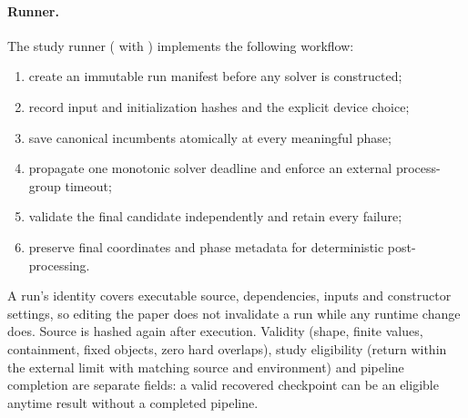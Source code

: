 \paragraph{Runner.} The study runner ( with
) implements the following workflow:
\begin{enumerate}
  \item create an immutable run manifest before any solver is constructed;
  \item record input and initialization hashes and the explicit device choice;
  \item save canonical incumbents atomically at every meaningful phase;
  \item propagate one monotonic solver deadline and enforce an external
        process-group timeout;
  \item validate the final candidate independently and retain every failure;
  \item preserve final coordinates and phase metadata for deterministic
        post-processing.
\end{enumerate}
A run's identity covers executable source, dependencies, inputs and constructor
settings, so editing the paper does not invalidate a run while any runtime change
does. Source is hashed again after execution. Validity (shape, finite values,
containment, fixed objects, zero hard overlaps), study eligibility (return within the
external limit with matching source and environment) and pipeline completion are
separate fields: a valid recovered checkpoint can be an eligible anytime result
without a completed pipeline.

